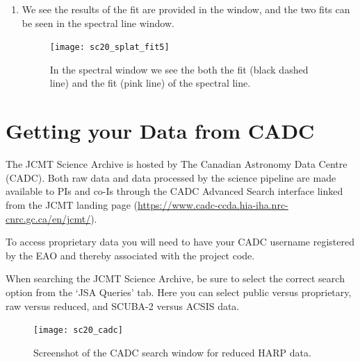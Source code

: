 \documentclass[11pt,oneside,chapters]{starlink}
\begin{document}
\begin{enumerate}[label=(\textbf{\arabic*})]
\item We see the results of the fit are provided in the
 window, and the two fits can
be seen in the spectral line window.

\begin{figure}[h!]
\begin{center}
\texttt{[image: sc20\_splat\_fit5]}
\caption[Spectrum with fits.]{\label{fig:splat_stats5}
  In the spectral window we see the both the 
  fit (black dashed line) and the  fit
  (pink line) of the spectral line.}
\end{center}
\end{figure}





\end{enumerate}



\clearpage
\chapter{Getting your Data from CADC}
\label{sec:fromcadc}

The JCMT Science Archive is hosted by The Canadian Astronomy Data
Centre (CADC). Both raw data and data processed by the science pipeline
are made available to PIs and co-Is through the CADC Advanced Search
interface linked from the JCMT landing page
(\url{https://www.cadc-ccda.hia-iha.nrc-cnrc.gc.ca/en/jcmt/}).

To access proprietary data you will need to have your CADC username
registered by the EAO and thereby associated with the project code.

When searching the JCMT Science Archive, be sure to select the correct
search option from the `JSA Queries' tab. Here you can select public
versus proprietary, raw versus reduced, and SCUBA-2 versus ACSIS data.

\begin{figure}[b!]
\begin{center}
\texttt{[image: sc20\_cadc]}
\caption{\label{fig:cadc}
  Screenshot of the CADC search window for reduced HARP data.}
\end{center}
\end{figure}

\end{document}
